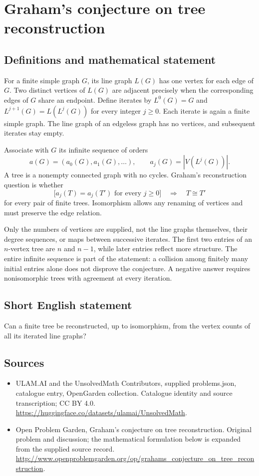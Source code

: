 \documentclass[11pt,a4paper]{article}
\begin{document}
\section*{Graham's conjecture on tree reconstruction}\label{statement}

\subsection{Definitions and mathematical statement}
For a finite simple graph $G$, its line graph $L(G)$ has one vertex
for each edge of $G$. Two distinct vertices of $L(G)$ are adjacent
precisely when the corresponding edges of $G$ share an endpoint.
Define iterates by $L^0(G)=G$ and $L^{j+1}(G)=L(L^j(G))$ for every
integer $j\geq0$. Each iterate is again a finite simple graph.
The line graph of an edgeless graph has no vertices, and subsequent
iterates stay empty.

Associate with $G$ its infinite sequence of orders
\[
 a(G)=(a_0(G),a_1(G),\ldots),\qquad a_j(G)=|V(L^j(G))|.
\]
A tree is a nonempty connected graph with no cycles. Graham's
reconstruction question is whether
\[
 \bigl[a_j(T)=a_j(T')\text{ for every }j\geq0\bigr]
 \quad\Longrightarrow\quad T\cong T'
\]
for every pair of finite trees. Isomorphism allows any renaming
of vertices and must preserve the edge relation.

Only the numbers of vertices are supplied, not the line graphs
themselves, their degree sequences, or maps between successive
iterates. The first two entries of an $n$-vertex tree are $n$ and
$n-1$, while later entries reflect more structure. The entire
infinite sequence is part of the statement: a collision among
finitely many initial entries alone does not disprove the
conjecture. A negative answer requires nonisomorphic trees with
agreement at every iteration.
\subsection{Short English statement}
Can a finite tree be reconstructed, up to isomorphism, from the vertex counts of all its iterated line graphs?
\subsection{Sources}
\begin{itemize}
\item[S1] ULAM.AI and the UnsolvedMath Contributors, supplied problems.json, catalogue entry, OpenGarden collection. Catalogue identity and source transcription; CC BY 4.0.
\url{https://huggingface.co/datasets/ulamai/UnsolvedMath}.
\item[S2] Open Problem Garden, Graham's conjecture on tree reconstruction. Original problem and discussion; the mathematical formulation below is expanded from the supplied source record.
\url{http://www.openproblemgarden.org/op/grahams_conjecture_on_tree_reconstruction}.
\end{itemize}
\end{document}
